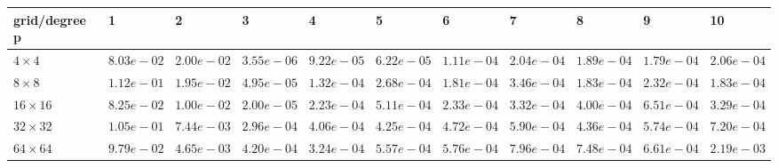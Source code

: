 \begin{tabular}{lllllllllll}
\hline
 grid/degree p   & 1          & 2          & 3          & 4          & 5          & 6          & 7          & 8          & 9          & 10         \\
\hline
 $4 \times 4$    & $8.03e-02$ & $2.00e-02$ & $3.55e-06$ & $9.22e-05$ & $6.22e-05$ & $1.11e-04$ & $2.04e-04$ & $1.89e-04$ & $1.79e-04$ & $2.06e-04$ \\
 $8 \times 8$    & $1.12e-01$ & $1.95e-02$ & $4.95e-05$ & $1.32e-04$ & $2.68e-04$ & $1.81e-04$ & $3.46e-04$ & $1.83e-04$ & $2.32e-04$ & $1.83e-04$ \\
 $16 \times 16$  & $8.25e-02$ & $1.00e-02$ & $2.00e-05$ & $2.23e-04$ & $5.11e-04$ & $2.33e-04$ & $3.32e-04$ & $4.00e-04$ & $6.51e-04$ & $3.29e-04$ \\
 $32 \times 32$  & $1.05e-01$ & $7.44e-03$ & $2.96e-04$ & $4.06e-04$ & $4.25e-04$ & $4.72e-04$ & $5.90e-04$ & $4.36e-04$ & $5.74e-04$ & $7.20e-04$ \\
 $64 \times 64$  & $9.79e-02$ & $4.65e-03$ & $4.20e-04$ & $3.24e-04$ & $5.57e-04$ & $5.76e-04$ & $7.96e-04$ & $7.48e-04$ & $6.61e-04$ & $2.19e-03$ \\
\hline
\end{tabular}